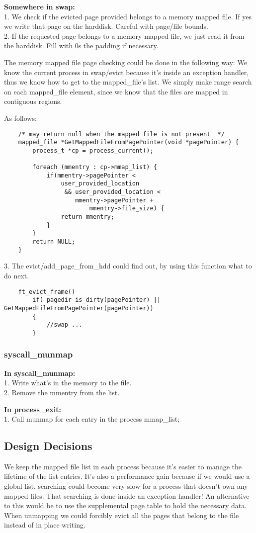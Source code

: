 	\textbf{Somewhere in swap:}
	\\1. We check if the evicted page provided belongs to a memory mapped file. If yes we write that page on the harddisk. Careful with page/file bounds.
	\\2. If the requested page belongs to a memory mapped file, we just read it from the harddisk. Fill with 0s the padding if necessary.

The memory mapped file page checking could be done in the following way: We know the current process in swap/evict because it's inside an exception handler, thus we know how to get to the mapped\_file's list. We simply make range search on each mapped\_file element, since we know that the files are mapped in contiguous regions.

As follows:
\begin{lstlisting}	
	/* may return null when the mapped file is not present  */
	mapped_file *GetMappedFileFromPagePointer(void *pagePointer) {
		process_t *cp = process_current();
		
		foreach (mmentry : cp->mmap_list) {
			if(mmentry->pagePointer < 
				user_provided_location 
				 && user_provided_location < 
					mmentry->pagePointer + 
						mmentry->file_size) {
				return mmentry;
			}
		}
		return NULL;
	}
\end{lstlisting}
	3. The evict/add\_page\_from\_hdd could find out, by using this function what to do next.
\begin{lstlisting}
	ft_evict_frame()
		if( pagedir_is_dirty(pagePointer) || GetMappedFileFromPagePointer(pagePointer))
		{
			//swap ...
		}
\end{lstlisting}

\subsubsection{ syscall\_munmap }
\textbf{In syscall\_munmap:}
	\\1. Write what's in the memory to the file. 
	\\2. Remove the mmentry from the list.

	 \textbf{In process\_exit:}
	\\1. Call munmap for each entry in the process mmap\_list;


\subsection{Design Decisions}
We keep the mapped file list in each process because it's easier to manage the lifetime of the list entries. It's also a performance gain because if we would use a global list, searching could become very slow for a process that doesn't own any mapped files. That searching is done inside an exception handler! An alternative to this would be to use the supplemental page table to hold the necessary data.
\\When unmapping we could forcibly evict all the pages that belong to the file instead of in place writing.
